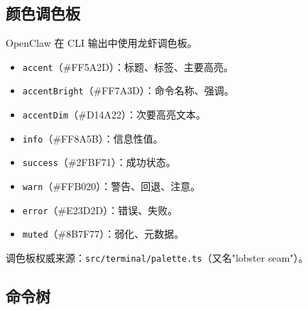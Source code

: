 \subsection{颜色调色板}


OpenClaw 在 CLI 输出中使用龙虾调色板。

\begin{itemize}
  \item \texttt{accent}（\#FF5A2D）：标题、标签、主要高亮。
  \item \texttt{accentBright}（\#FF7A3D）：命令名称、强调。
  \item \texttt{accentDim}（\#D14A22）：次要高亮文本。
  \item \texttt{info}（\#FF8A5B）：信息性值。
  \item \texttt{success}（\#2FBF71）：成功状态。
  \item \texttt{warn}（\#FFB020）：警告、回退、注意。
  \item \texttt{error}（\#E23D2D）：错误、失败。
  \item \texttt{muted}（\#8B7F77）：弱化、元数据。
\end{itemize}


调色板权威来源：\texttt{src/terminal/palette.ts}（又名"lobster seam"）。

\subsection{命令树}


